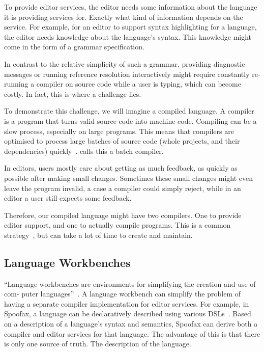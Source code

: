 To provide editor services, the editor needs some information about the language it is providing services for.
Exactly what kind of information depends on the service.
For example, for an editor to support syntax highlighting for a language, the editor needs knowledge about the language's syntax.
This knowledge might come in the form of a grammar specification.

In contrast to the relative simplicity of such a grammar, providing diagnostic messages or running reference
resolution interactively might require constantly re-running a compiler on source code while a user is typing,
which can become costly.
In fact, this is where a challenge lies.

To demonstrate this challenge, we will imagine a compiled language.
A compiler is a program that turns valid source code into machine code.
Compiling can be a slow process, especially on large programs.
This means that compilers are optimised to process large batches of source code (whole projects, and their dependencies)
quickly~\autocite{matkladlsp}.
\citeauthor{matkladlsp} calls this a batch compiler.

In editors, users mostly care about getting as much feedback, as quickly as possible after making small changes.
Sometimes these small changes might even leave the program invalid, a case a compiler could simply reject, while in an editor
a user still expects some feedback.

Therefore, our compiled language might have two compilers.
One to provide editor support, and one to actually compile programs.
This is a common strategy~\autocite{matkladlsp}, but can take a lot of time to create and maintain.

\subsection{Language Workbenches}\label{subsec:language-workbenches}

``Language workbenches are environments for simplifying the creation and use of com-
puter languages''~\autocite{ErdwegSVTBCGH0L15}.
A language workbench can simplify the problem of having a separate compiler implementation for editor services.
For example, in Spoofax, a language can be declaratively described using various \acp{DSL}~\autocite{KatsV10a}.
Based on a description of a language's syntax and semantics, Spoofax can derive both a compiler and editor services
for that language.
The advantage of this is that there is only one source of truth.
The description of the language.

